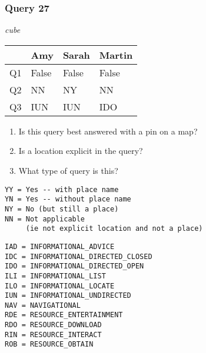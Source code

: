 \begin{frame}[fragile]
\frametitle{Query 27}
\vspace{1em}

\emph{cube}

\vfill

\begin{table}
  \centering
  \begin{tabular}{ l l l l }
    & \textbf{Amy} & \textbf{Sarah} & \textbf{Martin}\\
    \toprule
    Q1 & False & False & False\\
Q2 & NN & NY & NN\\
Q3 & IUN & IUN & IDO\\
    \bottomrule
  \end{tabular}
\end{table}

\vfill

\tiny{

\begin{enumerate}
\item Is this query best answered with a pin on a map?
\item Is a location explicit in the query?
\item What type of query is this?
\end{enumerate}

\vfill

\begin{multicols}{2}
\begin{verbatim}
YY = Yes -- with place name
YN = Yes -- without place name
NY = No (but still a place)
NN = Not applicable 
     (ie not explicit location and not a place)
\end{verbatim}

\columnbreak
\begin{verbatim}
IAD = INFORMATIONAL_ADVICE
IDC = INFORMATIONAL_DIRECTED_CLOSED
IDO = INFORMATIONAL_DIRECTED_OPEN
ILI = INFORMATIONAL_LIST
ILO = INFORMATIONAL_LOCATE
IUN = INFORMATIONAL_UNDIRECTED
NAV = NAVIGATIONAL
RDE = RESOURCE_ENTERTAINMENT
RDO = RESOURCE_DOWNLOAD
RIN = RESOURCE_INTERACT
ROB = RESOURCE_OBTAIN
\end{verbatim}
\end{multicols}
}

\end{frame}


